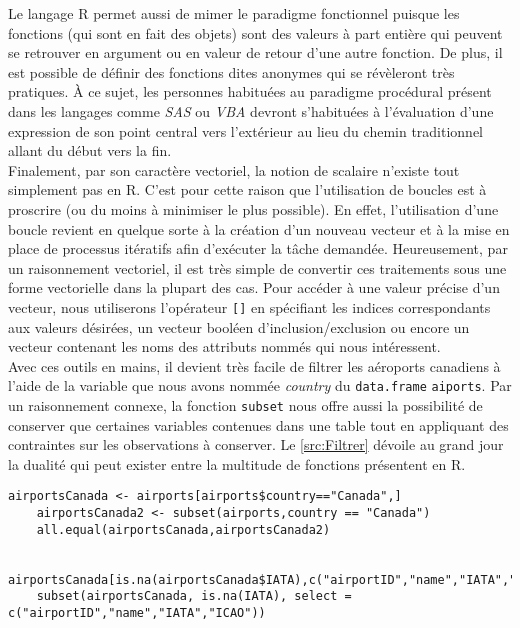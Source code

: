 Le langage R permet aussi de mimer le paradigme fonctionnel puisque les fonctions (qui sont en fait des objets) sont des valeurs à part entière qui peuvent se retrouver en argument ou en valeur de retour d'une autre fonction. De plus, il est possible de définir des fonctions dites anonymes qui se révèleront très pratiques. À ce sujet, les personnes habituées au paradigme procédural présent dans les langages comme \emph{SAS} ou \emph{VBA} devront s'habituées à l'évaluation d'une expression de son point central vers l'extérieur au lieu du chemin traditionnel allant du début vers la fin. \\

Finalement, par son caractère vectoriel, la notion de scalaire n'existe tout simplement pas en R. C'est pour cette raison que l'utilisation de boucles est à proscrire (ou du moins à minimiser le plus possible). En effet, l'utilisation d'une boucle revient en quelque sorte à la création d'un nouveau vecteur et à la mise en place de processus itératifs afin d'exécuter la tâche demandée. Heureusement, par un raisonnement vectoriel, il est très simple de convertir ces traitements sous une forme vectorielle dans la plupart des cas. \cite{Goulet} Pour accéder à une valeur précise d'un vecteur, nous utiliserons l'opérateur \texttt{[]} en spécifiant les indices correspondants aux valeurs désirées, un vecteur booléen d'inclusion/exclusion ou encore un vecteur contenant les noms des attributs nommés qui nous intéressent. \\

Avec ces outils en mains, il devient très facile de filtrer les aéroports canadiens à l'aide de la variable que nous avons nommée \emph{country} du \texttt{data.frame} \texttt{aiports}. Par un raisonnement connexe, la fonction \texttt{subset} \cite{Rfunction:subset} nous offre aussi la possibilité de conserver que certaines variables contenues dans une table tout en appliquant des contraintes sur les observations à conserver. Le \autoref{src:Filtrer} dévoile au grand jour la dualité qui peut exister entre la multitude de fonctions présentent en R. \\

\begin{lstlisting}[caption = Filtrer les données,label=src:Filter]
	airportsCanada <- airports[airports$country=="Canada",]
	airportsCanada2 <- subset(airports,country == "Canada")
	all.equal(airportsCanada,airportsCanada2)

	airportsCanada[is.na(airportsCanada$IATA),c("airportID","name","IATA","ICAO")]
	subset(airportsCanada, is.na(IATA), select = c("airportID","name","IATA","ICAO"))
\end{lstlisting}


